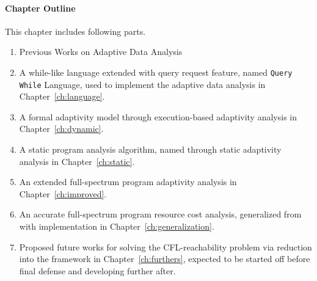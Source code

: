 \paragraph*{Chapter Outline}
This chapter includes following parts. 
\begin{enumerate}
   \item Previous Works on Adaptive Data Analysis
\item A while-like language extended with query request feature, named {\tt Query While} Language, 
used to implement 
the adaptive data analysis in Chapter~\ref{ch:language}. 
\item A formal adaptivity model through execution-based adaptivity analysis in Chapter~\ref{ch:dynamic}.
\item A static program analysis algorithm, named {\THESYSTEM} through static adaptivity analysis in Chapter~\ref{ch:static}.
\item An extended full-spectrum program adaptivity analysis in Chapter~\ref{ch:improved}.
\item An accurate full-spectrum program resource cost analysis, 
generalized from {\THESYSTEM} with implementation in Chapter~\ref{ch:generalization}.
\item Proposed future works for solving the CFL-reachability problem via reduction into the {\THESYSTEM} framework in
Chapter~\ref{ch:furthers},
expected to be started off before final defense and developing further after.
\end{enumerate}


